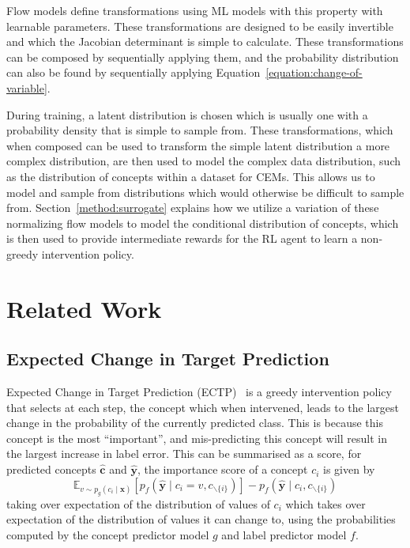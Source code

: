 Flow models define transformations
using ML models with this property with learnable parameters.
These transformations are designed to be easily invertible
and which the Jacobian determinant is simple to calculate.
These transformations can be composed by sequentially applying them,
and the probability distribution can also be found by sequentially
applying Equation~\ref{equation:change-of-variable}.

During training, a latent distribution is chosen
which is usually one with a 
probability density that is simple to sample from.
These transformations, which when composed can be used to 
transform the simple latent distribution a more complex distribution,
are then used to model the complex data distribution, such as 
the distribution of concepts within a dataset for CEMs. This allows 
us to model and sample from distributions which would otherwise 
be difficult to sample from.
Section~\ref{method:surrogate} explains how we utilize a variation of 
these normalizing flow models to model the conditional distribution of concepts,
which is then used to provide intermediate rewards for the RL agent 
to learn a non-greedy intervention policy.

\section{Related Work}

\subsection{Expected Change in Target Prediction}\label{background:ectp}
Expected Change in Target Prediction (ECTP)~\cite{ectp} is a greedy 
intervention policy that selects at each step, the concept which 
when intervened, leads to the largest change in the probability
of the currently predicted class. This is because this concept
is the most ``important'', and mis-predicting this concept
will result in the largest increase in label error. This can be 
summarised as a score, for predicted concepts $\hat{\mathbf{c}}$
and $\hat{\mathbf{y}}$, the importance score of a concept $c_i$ is given by
\[\mathbb{E}_{v \sim p_g(c_i \mid \mathbf{x})} 
[p_f(\hat{\mathbf{y}} \mid c_i = v, c_{\backslash\{i\}})] - p_f(\hat{\mathbf{y}} \mid c_i, c_{\backslash\{i\}})
\]
taking over expectation of the distribution of values of $c_i$
which takes over expectation of the distribution of values it can change to,
using the probabilities computed by the concept predictor model
$g$ and label predictor model $f$.


